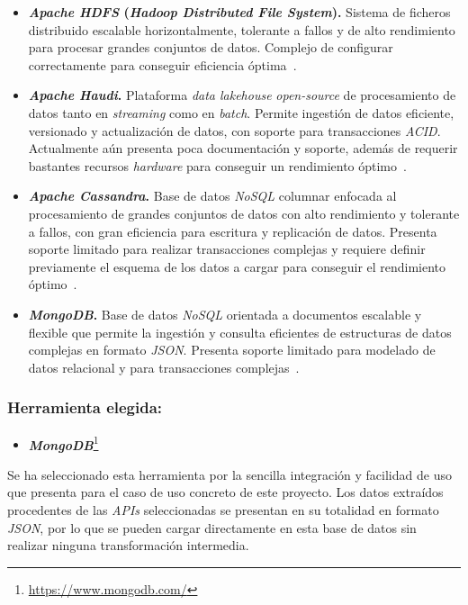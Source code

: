 \begin{itemize}
    \item \textbf{\textit{Apache HDFS} (\textit{Hadoop Distributed File System}).} Sistema de ficheros distribuido escalable horizontalmente, tolerante a fallos y de alto rendimiento para procesar grandes conjuntos de datos. Complejo de configurar correctamente para conseguir eficiencia óptima~\cite{hdfsArchitecture}.
    \item \textbf{\textit{Apache Haudi}.} Plataforma \textit{data lakehouse} \textit{open-source} de procesamiento de datos tanto en \textit{streaming} como en \textit{batch}. Permite ingestión de datos eficiente, versionado y actualización de datos, con soporte para transacciones \textit{ACID}. Actualmente aún presenta poca documentación y soporte, además de requerir bastantes recursos \textit{hardware} para conseguir un rendimiento óptimo~\cite{hudiOverview}.
    \item \textbf{\textit{Apache Cassandra}.} Base de datos \textit{NoSQL} columnar enfocada al procesamiento de grandes conjuntos de datos con alto rendimiento y tolerante a fallos, con gran eficiencia para escritura y replicación de datos. Presenta soporte limitado para realizar transacciones complejas y requiere definir previamente el esquema de los datos a cargar para conseguir el rendimiento óptimo~\cite{cassandraOverview}.
    \item \textbf{\textit{MongoDB}.} Base de datos \textit{NoSQL} orientada a documentos escalable y flexible que permite la ingestión y consulta eficientes de estructuras de datos complejas en formato \textit{JSON}. Presenta soporte limitado para modelado de datos relacional y para transacciones complejas~\cite{mongodbArchitecture}.
\end{itemize}

\subsubsection{Herramienta elegida:}

\begin{itemize}
    \item \textbf{\textit{MongoDB}}\footnote{\url{https://www.mongodb.com/}}
\end{itemize}

Se ha seleccionado esta herramienta por la sencilla integración y facilidad de uso que presenta para el caso de uso concreto de este proyecto. Los datos extraídos procedentes de las \textit{APIs} seleccionadas se presentan en su totalidad en formato \textit{JSON}, por lo que se pueden cargar directamente en esta base de datos sin realizar ninguna transformación intermedia. 

